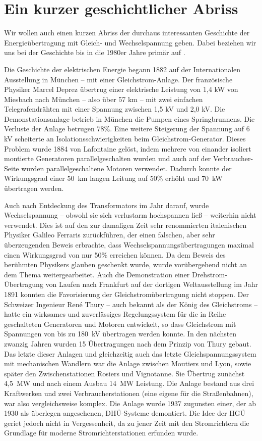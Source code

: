 
\section{Ein kurzer geschichtlicher Abriss}
Wir wollen auch einen kurzen Abriss der durchaus interessanten Geschichte der Energieübertragung mit Gleich- und Wechselspannung geben. Dabei beziehen wir uns bei der Geschichte bis in die 1980er Jahre primär auf \cite{Schymroch}.

Die Geschichte der elektrischen Energie begann 1882 auf der Internationalen Ausstellung in München – mit einer Gleichstrom-Anlage. Der französische Physiker Marcel Deprez übertrug einer elektrische Leistung von 1,4 kW von Miesbach nach München – also über 57 km – mit zwei einfachen Telegrafendrähten mit einer Spannung zwischen 1,5 kV und 2,0 kV. Die Demonstationsanlage betrieb in München die Pumpen eines Springbrunnens. Die Verluste der Anlage betrugen 78\%. Eine weitere Steigerung der Spannung auf 6 kV scheiterte an Isolationsschwierigkeiten beim Gleichstrom-Generator. Dieses Problem wurde 1884 von Lafontaine gelöst, indem mehrere von einander isoliert montierte Generatoren parallelgeschalten wurden und auch auf der Verbraucher-Seite wurden parallelgeschaltene Motoren verwendet. Dadurch konnte der Wirkungsgrad einer 50\ km langen Leitung auf 50\% erhöht und 70\ kW übertragen werden.

Auch nach Entdeckung des Transformators im Jahr darauf, wurde Wechselspannung -- obwohl sie sich verlustarm hochspannen ließ -- weiterhin nicht verwendet.
Dies ist auf den zur damaligen Zeit sehr renommierten italenischen Physiker Galileo Ferraris zurückführen,
der einen falschen, aber sehr überzeugenden Beweis erbrachte, dass Wechselspannungsübertragungen maximal einen Wirkungsgrad von nur 50\% erreichen können.
Da dem Beweis des berühmten Physikers glauben geschenkt wurde, wurde vorübergehend nicht an dem Thema weitergearbeitet.
Auch die Demonstration einer Drehstrom-Übertragung von Laufen nach Frankfurt auf der dortigen Weltausstellung im Jahr 1891 konnten die Favorisierung der Gleichstromübertragung nicht stoppen.
Der Schweizer Ingenieur René Thury -- auch bekannt als der König des Gleichstroms -- hatte ein wirksames und zuverlässiges Regelungssystem für die in Reihe geschalteten Generatoren und Motoren entwickelt, so dass Gleichstrom mit Spannungen von bis zu 180\ kV übertragen werden konnte. In den nächsten zwanzig Jahren wurden 15 Übertragungen nach dem Prinzip von Thury gebaut. Das letzte dieser Anlagen und gleichzeitig auch das letzte Gleichspannungssystem mit mechanischen Wandlern war die Anlage zwischen Moutiers und Lyon, sowie später den Zwischenstationen Rosiers und Vignotanne. Sie Übertrug zunächst 4,5\ MW und nach einem Ausbau 14\ MW Leistung. Die Anlage bestand aus drei Kraftwerken und zwei Verbraucherstationen (eine eigene für die Straßenbahnen), war also vergleichsweise komplex. Die Anlage wurde 1937 zugunsten einer, der ab 1930 als überlegen angesehenen, DHÜ-Systeme demontiert. Die Idee der HGÜ geriet jedoch nicht in Vergessenheit, da zu jener Zeit mit den Stromrichtern die Grundlage für moderne Stromrichterstationen erfunden wurde.

